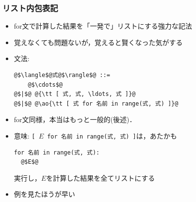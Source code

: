 \documentclass[10pt,dvipdfmx]{beamer}
\newcommand{\ao}[1]{{\color{blue}#1}}
\begin{document}
\begin{frame}[fragile]
\frametitle{リスト内包表記}
\begin{itemize}
\item for文で計算した結果を「一発で」リストにする強力な記法
\item 覚えなくても問題ないが，覚えると賢くなった気がする
\item 文法:
\begin{lstlisting}
@$\langle$@式@$\rangle$@ ::=
    @$\cdots$@
@$|$@ @{\tt [ 式, 式, \ldots, 式 ]}@
@$|$@ @\ao{\tt [ 式 for 名前 in range(式, 式) ]}@
\end{lstlisting}

\item for文同様，本当はもっと一般的(後述)．

\item 意味: {\tt [ $E$ for 名前 in range(式, 式) ]}は，あたかも
\begin{lstlisting}
for 名前 in range(式, 式): 
  @$E$@
\end{lstlisting}
実行し，$E$を計算した結果を全てリストにする

\item 例を見たほうが早い
\end{itemize}
\end{frame}
\end{document}
